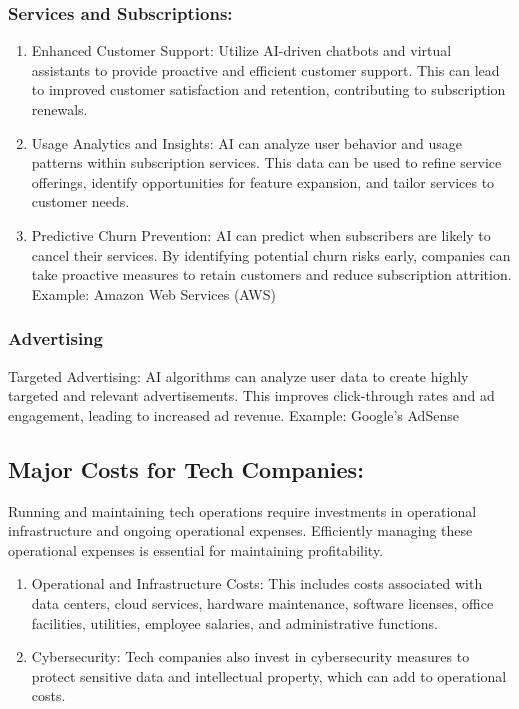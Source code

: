 \documentclass[
]{article}
\begin{document}
\hypertarget{services-and-subscriptions}{%
\subsubsection{Services and Subscriptions:}\label{services-and-subscriptions}}

\begin{enumerate}
\def\labelenumi{\arabic{enumi}.}
\item
  Enhanced Customer Support: Utilize AI-driven chatbots and virtual assistants to provide proactive and efficient customer support. This can lead to improved customer satisfaction and retention, contributing to subscription renewals.
\item
  Usage Analytics and Insights: AI can analyze user behavior and usage patterns within subscription services. This data can be used to refine service offerings, identify opportunities for feature expansion, and tailor services to customer needs.
\item
  Predictive Churn Prevention: AI can predict when subscribers are likely to cancel their services. By identifying potential churn risks early, companies can take proactive measures to retain customers and reduce subscription attrition.
  Example: Amazon Web Services (AWS)
\end{enumerate}

\hypertarget{advertising}{%
\subsubsection{Advertising}\label{advertising}}

Targeted Advertising: AI algorithms can analyze user data to create highly targeted and relevant advertisements. This improves click-through rates and ad engagement, leading to increased ad revenue.
Example: Google's AdSense

\hypertarget{major-costs-for-tech-companies}{%
\subsection{Major Costs for Tech Companies:}\label{major-costs-for-tech-companies}}

Running and maintaining tech operations require investments in operational infrastructure and ongoing operational expenses. Efficiently managing these operational expenses is essential for maintaining profitability.

\begin{enumerate}
\def\labelenumi{\arabic{enumi}.}
\item
  Operational and Infrastructure Costs: This includes costs associated with data centers, cloud services, hardware maintenance, software licenses, office facilities, utilities, employee salaries, and administrative functions.
\item
  Cybersecurity: Tech companies also invest in cybersecurity measures to protect sensitive data and intellectual property, which can add to operational costs.
\end{enumerate}
\end{document}
